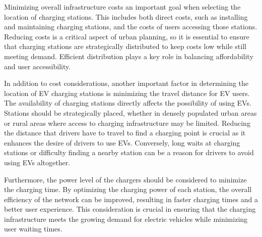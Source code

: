 \documentclass[12pt]{report}
\begin{document}
Minimizing overall infrastructure costs an important goal when selecting the location of charging stations. This includes both direct costs, such as installing and maintaining charging stations, and the costs of users accessing those stations. Reducing costs is a critical aspect of urban planning, so it is essential to ensure that charging stations are strategically distributed to keep costs low while still meeting demand. Efficient distribution plays a key role in balancing affordability and user accessibility.

In addition to cost considerations, another important factor in determining the location of EV charging stations is minimizing the travel distance for EV users. The availability of charging stations directly affects the possibility of using EVs. Stations should be strategically placed, whether in densely populated urban areas or rural areas where access to charging infrastructure may be limited. Reducing the distance that drivers have to travel to find a charging point is crucial as it enhances the desire of drivers to use EVs. Conversely, long waits at charging stations or difficulty finding a nearby station can be a reason for drivers to avoid using EVs altogether.

Furthermore, the power level of the chargers should be considered to minimize the charging time. By optimizing the charging power of each station, the overall efficiency of the network can be improved, resulting in faster charging times and a better user experience. This consideration is crucial in ensuring that the charging infrastructure meets the growing demand for electric vehicles while minimizing user waiting times.
\end{document}
